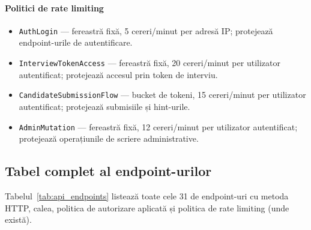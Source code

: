 \paragraph{Politici de rate limiting}
\begin{itemize}
  \item \texttt{AuthLogin} — fereastră fixă, 5 cereri/minut per adresă IP;
        protejează endpoint-urile de autentificare.
  \item \texttt{InterviewTokenAccess} — fereastră fixă, 20 cereri/minut per
        utilizator autentificat; protejează accesul prin token de interviu.
  \item \texttt{CandidateSubmissionFlow} — bucket de tokeni, 15 cereri/minut
        per utilizator autentificat; protejează submisiile și hint-urile.
  \item \texttt{AdminMutation} — fereastră fixă, 12 cereri/minut per utilizator
        autentificat; protejează operațiunile de scriere administrative.
\end{itemize}

\subsection{Tabel complet al endpoint-urilor}

Tabelul~\ref{tab:api_endpoints} listează toate cele 31 de endpoint-uri cu
metoda HTTP, calea, politica de autorizare aplicată și politica de rate
limiting (unde există).

%

